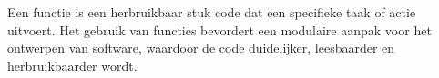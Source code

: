 Een functie is een herbruikbaar stuk code dat een specifieke taak of actie uitvoert. Het gebruik van functies bevordert een modulaire aanpak voor het ontwerpen van software, waardoor de code duidelijker, leesbaarder en herbruikbaarder wordt.

